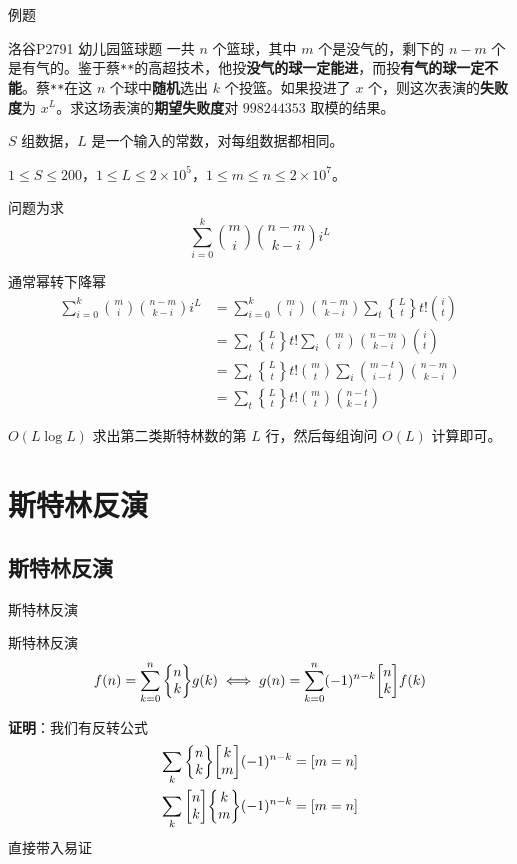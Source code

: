 \documentclass[UTF8]{beamer}
\begin{document}
    \begin{frame}{例题}
        \begin{block}{洛谷P2791 幼儿园篮球题}
        一共 $n$ 个篮球，其中 $m$ 个是没气的，剩下的 $n-m$ 个是有气的。鉴于蔡\texttt{**}的高超技术，他投\textbf{没气的球一定能进}，而投\textbf{有气的球一定不能}。蔡\texttt{**}在这 $n$ 个球中\textbf{随机}选出 $k$ 个投篮。如果投进了 $x$ 个，则这次表演的\textbf{失败度}为 $x^L$。求这场表演的\textbf{期望失败度}对 $998244353$ 取模的结果。

        $S$ 组数据，$L$ 是一个输入的常数，对每组数据都相同。

        $1\leq S\leq200$，$1\leq L\leq2\times 10^5$，$1\leq m\leq n\leq2\times 10^7$。
        \end{block}
        \pause

        问题为求
        $$
        \sum_{i=0}^k\binom mi\binom{n-m}{k-i}i^L
        $$
    \end{frame}

    \begin{frame}
        通常幂转下降幂
        \begin{align*}
            \sum_{i=0}^k\binom mi\binom{n-m}{k-i}i^L&=\sum_{i=0}^k\binom mi\binom{n-m}{k-i}\sum_{t}{L\brace t}t!\binom it\\
            & =\sum_{t}{L\brace t}t!\sum_i\binom mi\binom{n-m}{k-i}\binom it\\
            & =\sum_{t}{L\brace t}t!\binom mt\sum_i\binom {m-t}{i-t}\binom{n-m}{k-i}\\
            & =\sum_{t}{L\brace t}t!\binom mt\binom{n-t}{k-t}
        \end{align*}

        $O(L\log L)$ 求出第二类斯特林数的第 $L$ 行，然后每组询问 $O(L)$ 计算即可。
    \end{frame}

    \section{斯特林反演}
    \subsection{斯特林反演}
    \begin{frame}{斯特林反演}
        \begin{block}{斯特林反演}
            \vspace{-1em}
            $$
            f(n)=\sum_{k=0}^n \St nk g(k)\iff g(n) = \sum_{k=0}^n(-1)^{n-k}\st nk f(k)
            $$
            \vspace{-0.7em}
        \end{block}
        \pause
        \textbf{证明}：我们有反转公式
        \begin{gather*}
        \sum_{k} \St nk \st km (-1)^{n-k}=[m=n]\\
        \sum_{k} \st nk \St km (-1)^{n-k}=[m=n]
        \end{gather*}
        直接带入易证
    \end{frame}
\end{document}
